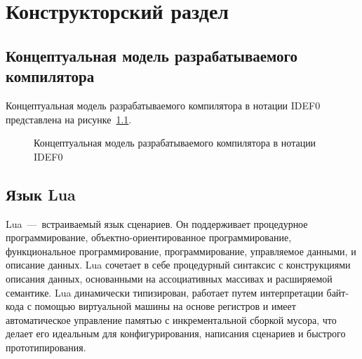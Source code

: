 \chapter{Конструкторский раздел}


\section{Концептуальная модель разрабатываемого компилятора}

Концептуальная модель разрабатываемого компилятора в нотации IDEF0 представлена на рисунке~\ref{idef0}.

\begin{figure}[H]
	\caption{Концептуальная модель разрабатываемого компилятора в нотации IDEF0}
	\label{idef0}
   \end{figure}

\section{Язык Lua}

Lua~---~встраиваемый язык сценариев. 
Он поддерживает процедурное программирование, объектно-ориентированное программирование, функциональное программирование, программирование, управляемое данными, и описание данных.
Lua сочетает в себе процедурный синтаксис с конструкциями описания данных, основанными на ассоциативных массивах и расширяемой семантике. 
Lua динамически типизирован, работает путем интерпретации байт-кода с помощью виртуальной машины на основе регистров и имеет автоматическое управление памятью с инкрементальной сборкой мусора, что делает его идеальным для конфигурирования, написания сценариев и быстрого прототипирования.

